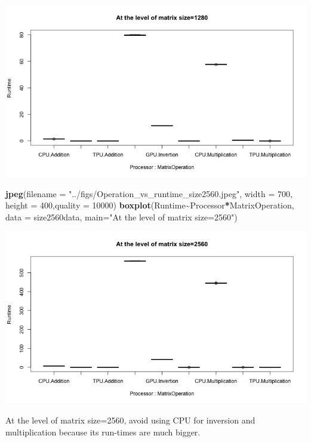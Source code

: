 \documentclass[
]{article}
\newenvironment{Shaded}{\begin{snugshade}}{\end{snugshade}}
\newcommand{\DataTypeTok}[1]{\textcolor[rgb]{0.13,0.29,0.53}{#1}}
\newcommand{\DecValTok}[1]{\textcolor[rgb]{0.00,0.00,0.81}{#1}}
\newcommand{\KeywordTok}[1]{\textcolor[rgb]{0.13,0.29,0.53}{\textbf{#1}}}
\newcommand{\NormalTok}[1]{#1}
\newcommand{\OperatorTok}[1]{\textcolor[rgb]{0.81,0.36,0.00}{\textbf{#1}}}
\newcommand{\StringTok}[1]{\textcolor[rgb]{0.31,0.60,0.02}{#1}}
\begin{document}
\begin{center}\includegraphics[width=0.9\linewidth]{../figs/Operation_vs_runtime_size1280} \end{center}

\begin{Shaded}
\begin{Highlighting}[]
\KeywordTok{jpeg}\NormalTok{(}\DataTypeTok{filename =} \StringTok{"../figs/Operation\_vs\_runtime\_size2560.jpeg"}\NormalTok{, }\DataTypeTok{width =} \DecValTok{700}\NormalTok{, }\DataTypeTok{height =} \DecValTok{400}\NormalTok{,}\DataTypeTok{quality =} \DecValTok{10000}\NormalTok{)}
\KeywordTok{boxplot}\NormalTok{(Runtime}\OperatorTok{\textasciitilde{}}\NormalTok{Processor}\OperatorTok{*}\NormalTok{MatrixOperation, }\DataTypeTok{data =}\NormalTok{ size2560data, }\DataTypeTok{main=}\StringTok{"At the level of matrix size=2560"}\NormalTok{)}
\end{Highlighting}
\end{Shaded}

\begin{center}\includegraphics[width=0.9\linewidth]{../figs/Operation_vs_runtime_size2560} \end{center}

At the level of matrix size=2560, avoid using CPU for inversion and
multiplication because its run-times are much bigger.
\end{document}
